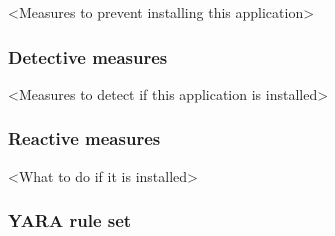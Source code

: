 <Measures to prevent installing this application>

\subsubsection{Detective measures}

<Measures to detect if this application is installed>

\subsubsection{Reactive measures}

<What to do if it is installed>

\newpage
\subsubsection{YARA rule set}


